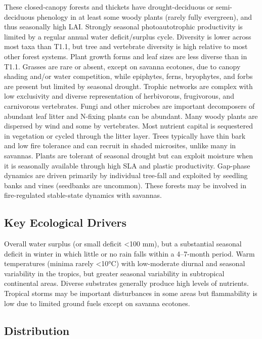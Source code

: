 \documentclass[
  letterpaper,
  DIV=11,
  numbers=noendperiod]{scrartcl}
\begin{document}
These closed-canopy forests and thickets have drought-deciduous or
semi-deciduous phenology in at least some woody plants (rarely fully
evergreen), and thus seasonally high LAI. Strongly seasonal
photoautotrophic productivity is limited by a regular annual water
deficit/surplus cycle. Diversity is lower across most taxa than T1.1,
but tree and vertebrate diversity is high relative to most other forest
systems. Plant growth forms and leaf sizes are less diverse than in
T1.1. Grasses are rare or absent, except on savanna ecotones, due to
canopy shading and/or water competition, while epiphytes, ferns,
bryophytes, and forbs are present but limited by seasonal drought.
Trophic networks are complex with low exclusivity and diverse
representation of herbivorous, frugivorous, and carnivorous vertebrates.
Fungi and other microbes are important decomposers of abundant leaf
litter and N-fixing plants can be abundant. Many woody plants are
dispersed by wind and some by vertebrates. Most nutrient capital is
sequestered in vegetation or cycled through the litter layer. Trees
typically have thin bark and low fire tolerance and can recruit in
shaded microsites, unlike many in savannas. Plants are tolerant of
seasonal drought but can exploit moisture when it is seasonally
available through high SLA and plastic productivity. Gap-phase dynamics
are driven primarily by individual tree-fall and exploited by seedling
banks and vines (seedbanks are uncommon). These forests may be involved
in fire-regulated stable-state dynamics with savannas.

\subsection{Key Ecological Drivers}\label{key-ecological-drivers-70}

Overall water surplus (or small deficit \textless100 mm), but a
substantial seasonal deficit in winter in which little or no rain falls
within a 4--7-month period. Warm temperatures (minima rarely
\textless10°C) with low-moderate diurnal and seasonal variability in the
tropics, but greater seasonal variability in subtropical continental
areas. Diverse substrates generally produce high levels of nutrients.
Tropical storms may be important disturbances in some areas but
flammability is low due to limited ground fuels except on savanna
ecotones.

\subsection{Distribution}\label{distribution-70}
\end{document}
